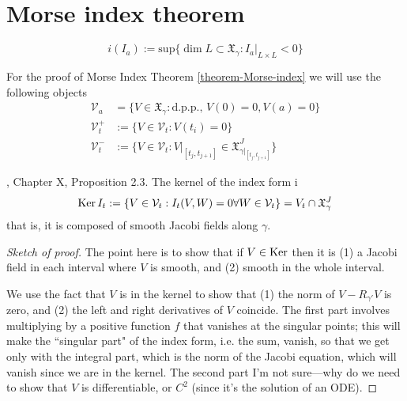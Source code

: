 \section{Morse index theorem}
\label{section-morse-index}

\begin{definition}
\label{definition-index-index-form}
$$
i(I_a):=\text{sup}\{\dim L \subset \mathfrak{X}_\gamma:I_a |_{L \times L}<0\}
$$
\end{definition}

For the proof of Morse Index Theorem \ref{theorem-Morse-index} we will use the
following objects
\begin{equation}
\label{equation-index-theorem-spaces}
\begin{aligned}
\mathcal{V}_a&=\{V \in \mathfrak{X}_\gamma:\text{d.p.p., }V(0)=0, V(a)=0\}\\
\mathcal{V}_t^+&:=\{V \in \mathcal{V}_t:V(t_i)=0\}\\
\mathcal{V}_t^-& :=\{V \in \mathcal{V}_t:V|_{[t_j,t_{j+1}]}\in
\mathfrak{X}_{\gamma|_{[t_j,t_{j+1}]}}^J\}
\end{aligned}
\end{equation}

\begin{proposition}
\label{proposition-kernel-of-index-form}
\cite{doc}, Chapter X, Proposition 2.3. The kernel of the index form i
$$
\mathop{\mathrm{Ker}} I_t:=\{V \in \mathcal{V}_t:I_t(V,W)=0\forall W\in\mathcal{V}_t\}=
V_t \cap \mathfrak{X}_\gamma^J 
$$
that is, it is composed of smooth Jacobi fields along $\gamma$.
\end{proposition}

\begin{proof}[Sketch of proof]
The point here is to show that if $V \in \mathop{\mathrm{Ker}}$ then it is (1) a Jacobi
 field in each interval where $V$ is smooth, and (2) smooth in the whole
 interval.

We use the fact that $V$ is in the kernel to show that (1) the norm of 
$V-R_{\gamma'}V$ is zero, and (2) the left and right derivatives of $V$
coincide. The first part involves multiplying by a positive function $f$ that
vanishes at the singular points; this will make the ``singular part" of the
index form, i.e. the sum, vanish, so that we get only with the integral part,
which is the norm of the Jacobi equation, which will vanish since we are in the
kernel. The second part I'm not sure---why do we need to show that $V$ is
differentiable, or $C^2$ (since it's the solution of an ODE).
\end{proof}

